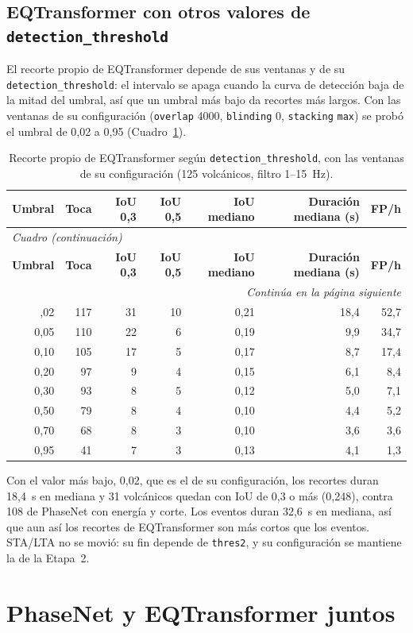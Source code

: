 \documentclass[11pt,a4paper,oneside,spanish,oldfontcommands]{memoir}
\newcommand{\cabecera}[2]{%
  \toprule #1 \\ \midrule \endfirsthead
  \multicolumn{#2}{l}{\itshape Cuadro \thetable{} (continuación)}\\
  \toprule #1 \\ \midrule \endhead
  \midrule \multicolumn{#2}{r}{\itshape Continúa en la página siguiente}\\ \endfoot
  \bottomrule \endlastfoot}
\begin{document}
\subsection*{EQTransformer con otros valores de \texttt{detection\_threshold}}

El recorte propio de EQTransformer depende de sus ventanas y de su
\texttt{detection\_threshold}: el intervalo se apaga cuando la curva de
detección baja de la mitad del umbral, así que un umbral más bajo da recortes
más largos. Con las ventanas de su configuración (\texttt{overlap} 4000,
\texttt{blinding} 0, \texttt{stacking} \texttt{max}) se probó el umbral de 0,02
a 0,95 (Cuadro~\ref{tab:iou-eqt}).

{\small
\setlength{\tabcolsep}{4pt}
\begin{longtable}{rrrrrrr}
\caption{Recorte propio de EQTransformer según \texttt{detection\_threshold}, con las ventanas de su configuración (125 volcánicos, filtro 1--15~Hz).}\label{tab:iou-eqt}\\
\cabecera{\textbf{Umbral} & \textbf{Toca} & \textbf{IoU 0,3} & \textbf{IoU 0,5} & \textbf{IoU mediano} & \textbf{Duración mediana (s)} & \textbf{FP/h}}{7}
0,02 & 117 & 31 & 10 & 0,21 & 18,4 & 52,7 \\
0,05 & 110 & 22 & 6 & 0,19 & 9,9 & 34,7 \\
0,10 & 105 & 17 & 5 & 0,17 & 8,7 & 17,4 \\
0,20 & 97 & 9 & 4 & 0,15 & 6,1 & 8,4 \\
0,30 & 93 & 8 & 5 & 0,12 & 5,0 & 7,1 \\
0,50 & 79 & 8 & 4 & 0,10 & 4,4 & 5,2 \\
0,70 & 68 & 8 & 3 & 0,10 & 3,6 & 3,6 \\
0,95 & 41 & 7 & 3 & 0,13 & 4,1 & 1,3 \\
\end{longtable}
}

Con el valor más bajo, 0,02, que es el de su configuración, los recortes duran
18,4~s en mediana y 31 volcánicos quedan con IoU de 0,3 o más (0,248), contra
108 de PhaseNet con energía y corte. Los eventos duran 32,6~s en mediana, así
que aun así los recortes de EQTransformer son más cortos que los eventos.
STA/LTA no se movió: su fin depende de \texttt{thres2}, y su configuración se
mantiene la de la Etapa~2.

\section{PhaseNet y EQTransformer juntos}\label{sec:fusion}
\end{document}
